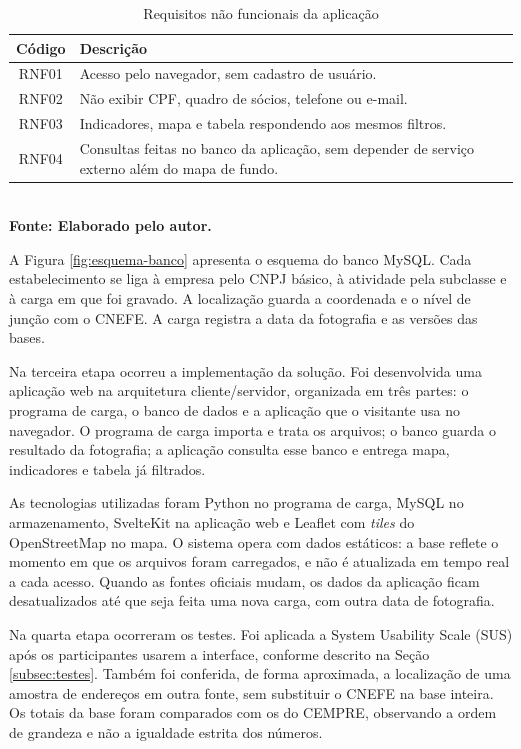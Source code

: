 \begin{table}[H]
    \centering
    \caption{Requisitos não funcionais da aplicação}
    \label{tab:rnf}
    \begin{tabular}{|c|p{11.5cm}|}
        \hline
        \textbf{Código} & \textbf{Descrição} \\
        \hline
        RNF01 & Acesso pelo navegador, sem cadastro de usuário. \\
        \hline
        RNF02 & Não exibir CPF, quadro de sócios, telefone ou e-mail. \\
        \hline
        RNF03 & Indicadores, mapa e tabela respondendo aos mesmos filtros. \\
        \hline
        RNF04 & Consultas feitas no banco da aplicação, sem depender de serviço externo além do mapa de fundo. \\
        \hline
    \end{tabular}
    \\\textbf{\footnotesize Fonte: Elaborado pelo autor.}
\end{table}

A Figura \ref{fig:esquema-banco} apresenta o esquema do banco MySQL.
Cada estabelecimento se liga à empresa pelo CNPJ básico, à atividade pela subclasse e à carga em que foi gravado.
A localização guarda a coordenada e o nível de junção com o CNEFE.
A carga registra a data da fotografia e as versões das bases.



Na terceira etapa ocorreu a implementação da solução.
Foi desenvolvida uma aplicação web na arquitetura cliente/servidor, organizada em três partes: o programa de carga, o banco de dados e a aplicação que o visitante usa no navegador.
O programa de carga importa e trata os arquivos; o banco guarda o resultado da fotografia; a aplicação consulta esse banco e entrega mapa, indicadores e tabela já filtrados.

As tecnologias utilizadas foram Python no programa de carga, MySQL no armazenamento, SvelteKit na aplicação web e Leaflet com \textit{tiles} do OpenStreetMap no mapa.
O sistema opera com dados estáticos: a base reflete o momento em que os arquivos foram carregados, e não é atualizada em tempo real a cada acesso.
Quando as fontes oficiais mudam, os dados da aplicação ficam desatualizados até que seja feita uma nova carga, com outra data de fotografia.

Na quarta etapa ocorreram os testes.
Foi aplicada a System Usability Scale (SUS) após os participantes usarem a interface, conforme descrito na Seção \ref{subsec:testes}.
Também foi conferida, de forma aproximada, a localização de uma amostra de endereços em outra fonte, sem substituir o CNEFE na base inteira.
Os totais da base foram comparados com os do CEMPRE, observando a ordem de grandeza e não a igualdade estrita dos números.
